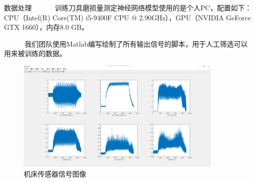 % 
% 
% 
\begin{frame}{数据处理}
\ \ \ \ \ \ 训练刀具磨损量测定神经网络模型使用的是个人PC，配置如下：CPU（Intel(R) Core(TM) i5-9400F CPU @ 2.90GHz），GPU（NVIDIA GeForce GTX 1660），内存8.0 GB。 \par
\ \ \ \ \ \ 我们团队使用Matlab编写绘制了所有输出信号的脚本，用于人工筛选可以用来被训练的数据。\par
% 
\begin{figure}[htp]
    \centering
    \includegraphics[width=10cm]{刀具磨损量预测神经网络/signal.png}
    \caption{机床传感器信号图像}
\end{figure}
% 
\end{frame}
% 
% 
% 
% 
